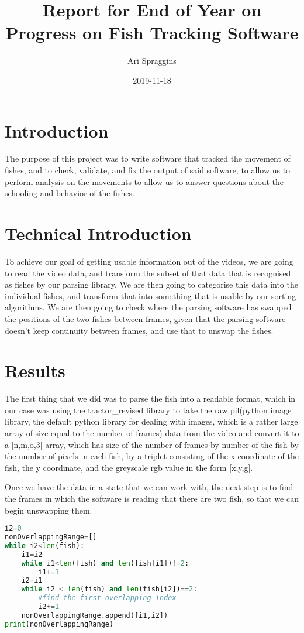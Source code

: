 \documentclass[12pt]{article}
\title{Report for End of Year on Progress on Fish Tracking Software}
\author{Ari Spraggins}
\date{2019-11-18}
\begin{document}
\maketitle

\section*{Introduction}

The purpose of this project was to write software that tracked the movement of fishes, and to check, validate, and fix the output of said software, to allow us to perform analysis on the movements to allow us to answer questions about the schooling and behavior of the fishes.

\section*{Technical Introduction}

To achieve our goal of getting usable information out of the videos, we are going to read the video data, and transform the subset of that data that is recognised as fishes by our parsing library. We are then going to categorise this data into the individual fishes, and transform that into something that is usable by our sorting algorithms. We are then going to check where the parsing software has swapped the positions of the two fishes between frames, given that the parsing software doesn't keep continuity between frames, and use that to unswap the fishes.

\section*{Results}

The first thing that we did was to parse the fish into a readable format, which in our case was using the tractor\_revised library to take the raw pil(python image library, the default python library for dealing with images, which is a rather large array of size equal to the number of frames) data from the video and convert it to a [n,m,o,3] array, which has size of the number of frames by number of the fish by the number of pixels in each fish, by a triplet consisting of the x coordinate of the fish, the y coordinate, and the greyscale rgb value in the form [x,y,g].  

Once we have the data in a state that we can work with, the next step is to find the frames in which the software is reading that there are two fish, so that we can begin unswapping them. 
\begin{lstlisting}[language=Python]
i2=0
nonOverlappingRange=[]
while i2<len(fish):
    i1=i2
    while i1<len(fish) and len(fish[i1])!=2:
        i1+=1
    i2=i1
    while i2 < len(fish) and len(fish[i2])==2:
        #find the first overlapping index
        i2+=1
    nonOverlappingRange.append([i1,i2])
print(nonOverlappingRange)
\end{lstlisting}
\end{document}
